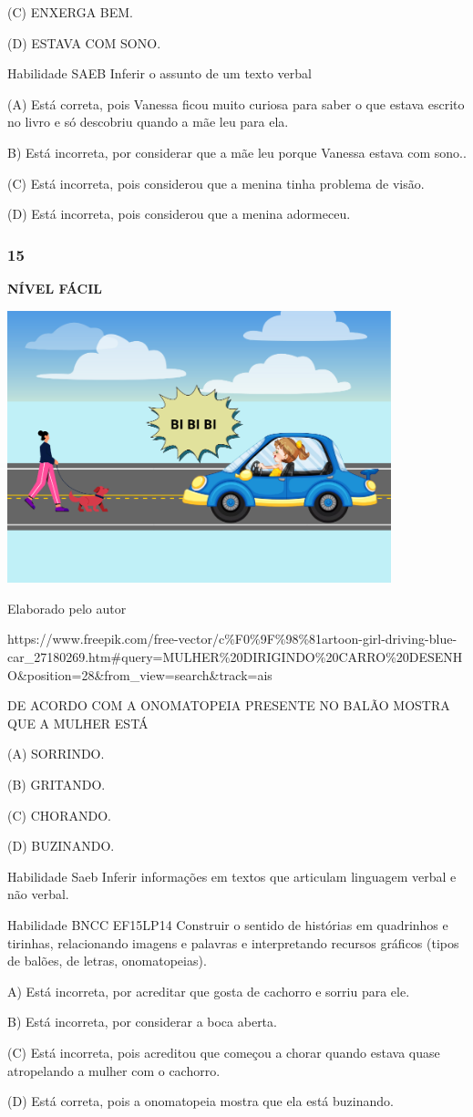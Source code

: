 (C) ENXERGA BEM.

(D) ESTAVA COM SONO.

Habilidade SAEB Inferir o assunto de um texto verbal

(A) Está correta, pois Vanessa ficou muito curiosa para saber o que
estava escrito no livro e só descobriu quando a mãe leu para ela.

B) Está incorreta, por considerar que a mãe leu porque Vanessa estava
com sono..

(C) Está incorreta, pois considerou que a menina tinha problema de
visão.

(D) Está incorreta, pois considerou que a menina adormeceu.

\subsubsection{15}\label{section-157}

\textbf{NÍVEL FÁCIL}

\includegraphics[width=4.38462in,height=3.11119in]{media/image182.png}

Elaborado pelo autor

https://www.freepik.com/free-vector/c\%F0\%9F\%98\%81artoon-girl-driving-blue-car\_27180269.htm\#query=MULHER\%20DIRIGINDO\%20CARRO\%20DESENHO\&position=28\&from\_view=search\&track=ais

DE ACORDO COM A ONOMATOPEIA PRESENTE NO BALÃO MOSTRA QUE A MULHER ESTÁ

(A) SORRINDO.

(B) GRITANDO.

(C) CHORANDO.

(D) BUZINANDO.

Habilidade Saeb Inferir informações em textos que articulam linguagem
verbal e não verbal.

Habilidade BNCC EF15LP14 Construir o sentido de histórias em quadrinhos
e tirinhas, relacionando imagens e palavras e interpretando recursos
gráficos (tipos de balões, de letras, onomatopeias).

A) Está incorreta, por acreditar que gosta de cachorro e sorriu para
ele.

B) Está incorreta, por considerar a boca aberta.

(C) Está incorreta, pois acreditou que começou a chorar quando estava
quase atropelando a mulher com o cachorro.

(D) Está correta, pois a onomatopeia mostra que ela está buzinando.
